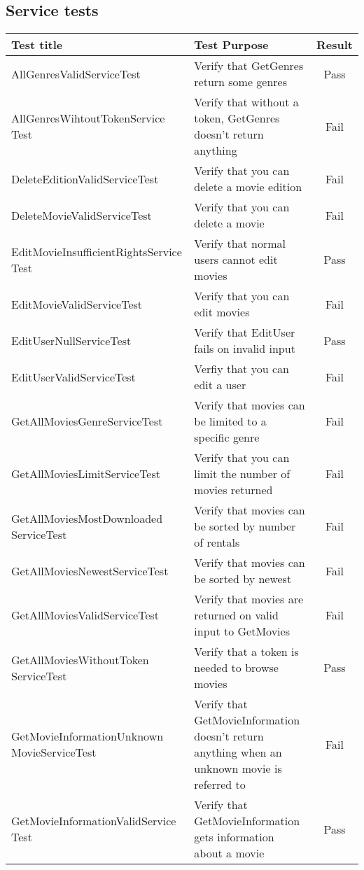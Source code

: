 \subsection{Service tests}
\label{Appendix_Test_Table_Service}
\begin{centering}
\begin{longtable}{| p{5 cm} | p{9 cm} | c |}
\hline
Test title & Test Purpose & Result\\
\hline
AllGenresValidServiceTest & Verify that GetGenres return some genres & Pass\\
\hline
AllGenresWihtoutTokenService Test & Verify that without a token, GetGenres doesn't return anything & Fail\\
\hline
DeleteEditionValidServiceTest & Verify that you can delete a movie edition & Fail\\
\hline
DeleteMovieValidServiceTest & Verify that you can delete a movie & Fail\\
\hline
EditMovieInsufficientRightsService Test & Verify that normal users cannot edit movies & Pass\\
\hline
EditMovieValidServiceTest & Verify that you can edit movies & Fail\\
\hline
EditUserNullServiceTest & Verify that EditUser fails on invalid input & Pass\\
\hline
EditUserValidServiceTest & Verfiy that you can edit a user & Fail\\
\hline
GetAllMoviesGenreServiceTest & Verify that movies can be limited to a specific genre & Fail\\
\hline
GetAllMoviesLimitServiceTest & Verify that you can limit the number of movies returned & Fail\\
\hline
GetAllMoviesMostDownloaded ServiceTest & Verify that movies can be sorted by number of rentals & Fail\\
\hline
GetAllMoviesNewestServiceTest & Verify that movies can be sorted by newest & Fail\\
\hline
GetAllMoviesValidServiceTest & Verify that movies are returned on valid input to GetMovies & Fail\\
\hline
GetAllMoviesWithoutToken ServiceTest & Verify that a token is needed to browse movies & Pass\\
\hline
GetMovieInformationUnknown MovieServiceTest & Verify that GetMovieInformation doesn't return anything when an unknown movie is referred to & Fail\\
\hline
GetMovieInformationValidService Test & Verify that GetMovieInformation gets information about a movie & Pass\\

\end{longtable}
\end{centering}
